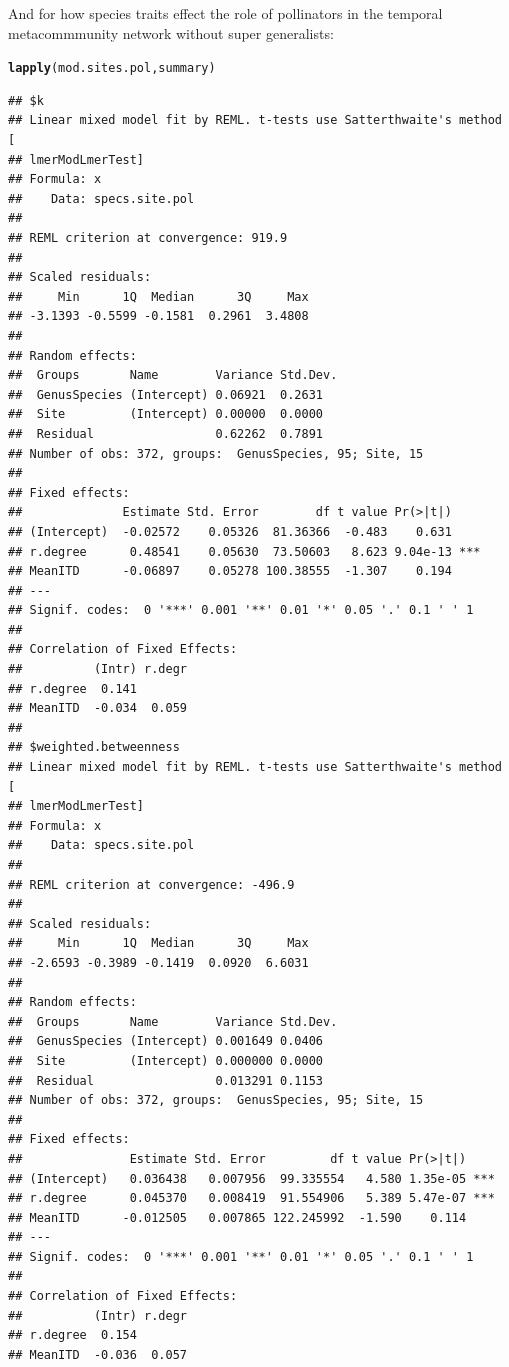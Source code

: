 \documentclass{article}\usepackage[]{graphicx}\usepackage[]{color}
\makeatletter
\newcommand{\hlstd}[1]{\textcolor[rgb]{0.345,0.345,0.345}{#1}}%
\newcommand{\hlkwd}[1]{\textcolor[rgb]{0.737,0.353,0.396}{\textbf{#1}}}%
\newenvironment{kframe}{%
 \def\at@end@of@kframe{}%
 \ifinner\ifhmode%
  \def\at@end@of@kframe{\end{minipage}}%
  \begin{minipage}{\columnwidth}%
 \fi\fi%
 \def\FrameCommand##1{\hskip\@totalleftmargin \hskip-\fboxsep
 \colorbox{shadecolor}{##1}\hskip-\fboxsep
     \hskip-\linewidth \hskip-\@totalleftmargin \hskip\columnwidth}%
 \MakeFramed {\advance\hsize-\width
   \@totalleftmargin\z@ \linewidth\hsize
   \@setminipage}}%
 {\par\unskip\endMakeFramed%
 \at@end@of@kframe}
\newenvironment{knitrout}{}{} %
\makeatother
\begin{document}
And for how species traits effect the role of pollinators in
the temporal metacommmunity network without super generalists: 
\begin{knitrout}
\color{fgcolor}\begin{kframe}
\begin{alltt}
\hlkwd{lapply}\hlstd{(mod.sites.pol, summary)}
\end{alltt}
\begin{verbatim}
## $k
## Linear mixed model fit by REML. t-tests use Satterthwaite's method [
## lmerModLmerTest]
## Formula: x
##    Data: specs.site.pol
## 
## REML criterion at convergence: 919.9
## 
## Scaled residuals: 
##     Min      1Q  Median      3Q     Max 
## -3.1393 -0.5599 -0.1581  0.2961  3.4808 
## 
## Random effects:
##  Groups       Name        Variance Std.Dev.
##  GenusSpecies (Intercept) 0.06921  0.2631  
##  Site         (Intercept) 0.00000  0.0000  
##  Residual                 0.62262  0.7891  
## Number of obs: 372, groups:  GenusSpecies, 95; Site, 15
## 
## Fixed effects:
##              Estimate Std. Error        df t value Pr(>|t|)    
## (Intercept)  -0.02572    0.05326  81.36366  -0.483    0.631    
## r.degree      0.48541    0.05630  73.50603   8.623 9.04e-13 ***
## MeanITD      -0.06897    0.05278 100.38555  -1.307    0.194    
## ---
## Signif. codes:  0 '***' 0.001 '**' 0.01 '*' 0.05 '.' 0.1 ' ' 1
## 
## Correlation of Fixed Effects:
##          (Intr) r.degr
## r.degree  0.141       
## MeanITD  -0.034  0.059
## 
## $weighted.betweenness
## Linear mixed model fit by REML. t-tests use Satterthwaite's method [
## lmerModLmerTest]
## Formula: x
##    Data: specs.site.pol
## 
## REML criterion at convergence: -496.9
## 
## Scaled residuals: 
##     Min      1Q  Median      3Q     Max 
## -2.6593 -0.3989 -0.1419  0.0920  6.6031 
## 
## Random effects:
##  Groups       Name        Variance Std.Dev.
##  GenusSpecies (Intercept) 0.001649 0.0406  
##  Site         (Intercept) 0.000000 0.0000  
##  Residual                 0.013291 0.1153  
## Number of obs: 372, groups:  GenusSpecies, 95; Site, 15
## 
## Fixed effects:
##               Estimate Std. Error         df t value Pr(>|t|)    
## (Intercept)   0.036438   0.007956  99.335554   4.580 1.35e-05 ***
## r.degree      0.045370   0.008419  91.554906   5.389 5.47e-07 ***
## MeanITD      -0.012505   0.007865 122.245992  -1.590    0.114    
## ---
## Signif. codes:  0 '***' 0.001 '**' 0.01 '*' 0.05 '.' 0.1 ' ' 1
## 
## Correlation of Fixed Effects:
##          (Intr) r.degr
## r.degree  0.154       
## MeanITD  -0.036  0.057
\end{verbatim}
\end{kframe}
\end{knitrout}
\clearpage
\end{document}
